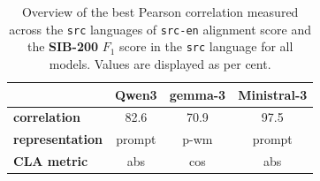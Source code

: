 \setlength{\tabcolsep}{4.5pt}
\begin{table}[ht]
    \centering\footnotesize
    \begin{tabularx}{\columnwidth}%
    {X | c  c c}
        \toprule
         & \textbf{Qwen3} & \textbf{gemma-3} & \textbf{Ministral-3} \\
        \midrule
        \textbf{correlation} & 82.6 & 70.9 & 97.5 \\
        \textbf{representation} & prompt & p-wm & prompt \\
        \textbf{ CLA metric} & abs & cos & abs \\
        \bottomrule
    \end{tabularx}
    \caption{Overview of the best Pearson correlation measured across the \texttt{src} languages of \texttt{src-en} alignment score and the \textbf{{SIB-200}} \(F_1\) score in the \texttt{src} language for all models. Values are displayed as per cent.}
    \label{tab:overview-corr-en-task-sib-200}
\end{table}